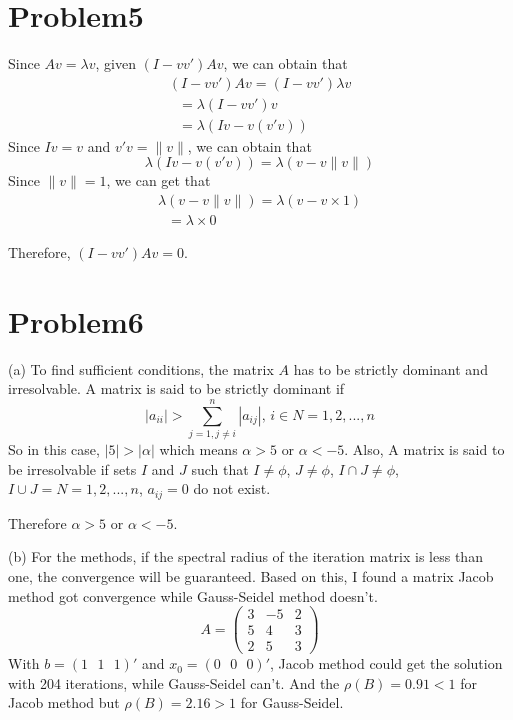 \documentclass[11pt]{article}
\begin{document}
	\section{Problem5}
	\par Since $Av = \lambda v$, given $(I - vv')Av$, we can obtain that
	\begin{equation}\begin{split}
		(I - vv')Av = (I - vv')\lambda v\\
		\mbox{   }= \lambda (I - vv')v\\
		\mbox{   }= \lambda (Iv - v(v'v))
	\end{split}\end{equation}
	Since $Iv = v$ and $v'v = \|v\|$, we can obtain that
	\begin{equation}
		\lambda (Iv - v(v'v)) = \lambda (v - v\|v\|)
	\end{equation}
	Since $\|v\| = 1$, we can get that
	\begin{equation}\begin{split}
		\lambda (v - v\|v\|) = \lambda (v - v\times 1)\\
		\mbox{   }= \lambda \times 0
	\end{split}\end{equation}
	\par Therefore, $(I - vv')Av = 0$.
	\section{Problem6}
	\par (a) To find sufficient conditions, the matrix $A$ has to be strictly dominant and irresolvable. A matrix is said to be strictly dominant if
	\begin{equation}
		|a_{ii}| > \sum_{j=1,j\neq i}^n{|a_{ij}|}\mbox{, }i\in N = {1,2,...,n}
	\end{equation}
	So in this case, $|5| > |\alpha|$ which means $\alpha > 5 \mbox{ or }\alpha < {-5}$. Also, A matrix is said to be irresolvable if sets $I$ and $J$ such that $I\neq \phi$, $J\neq \phi$, $I\cap J\neq \phi$, $I\cup J = N = {1,2,...,n}$, $a_{ij} = 0$ do not exist.
	\par Therefore $\alpha > 5 \mbox{ or }\alpha < {-5}$.
	\par (b) For the methods, if the spectral radius of the iteration matrix is less than one, the convergence will be guaranteed. Based on this, I found a matrix Jacob method got convergence while Gauss-Seidel method doesn't.
	\begin{equation}
		A = \left(\begin{array}{ccccc}
		3 & -5 & 2\\
		5 & 4 & 3\\
		2 & 5 & 3
		\end{array}\right)
	\end{equation}
	With $b = (1\mbox{ }1\mbox{ }1)'$ and $x_0 = (0\mbox{ }0\mbox{ }0)'$, Jacob method could get the solution with 204 iterations, while Gauss-Seidel can't. And the $\rho (B) = 0.91 < 1$ for Jacob method but $\rho (B) = 2.16 > 1$ for Gauss-Seidel.
	
\end{document}
